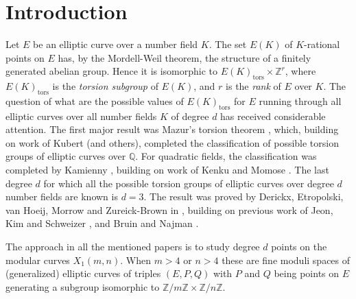 \documentclass[11pt,reqno]{amsart}
\theoremstyle{definition}
\numberwithin{equation}{section}
\newcommand{\Q}{\mathbb{Q}}
\newcommand{\Z}{\mathbb{Z}}
\newcommand{\tor}{\mathrm{tors}}
\def\tg#1#2{\mathbb Z/#1\mathbb Z \times \mathbb Z /#2 \mathbb Z}
\begin{document}
\section{Introduction}
Let $E$ be an elliptic curve over a number field $K$. The set $E(K)$ of $K$-rational points on $E$ has, by the Mordell-Weil theorem, the structure of a finitely generated abelian group. Hence it is isomorphic to $E(K)_\tor \times \Z^r$, where $E(K)_\tor$ is the \textit{torsion subgroup} of $E(K)$, and $r$ is the \textit{rank} of $E$ over $K$. The question of what are the possible values of $E(K)_\tor$ for $E$ running through all elliptic curves over all number fields $K$ of degree $d$ has received considerable attention. The first major result was Mazur's torsion theorem \cite{mazur77}, which, building on work of Kubert \cite{Kubert76} (and others), completed the classification of possible torsion groups of elliptic curves over $\Q.$ For quadratic fields, the classification was completed by Kamienny \cite{kamienny92}, building on work of Kenku and Momose \cite{KM88}. The last degree $d$ for which all the possible torsion groups of elliptic curves over degree $d$ number fields are known is $d=3$. The result was proved by Derickx, Etropolski, van Hoeij, Morrow and Zureick-Brown in \cite{Deg3Class}, building on previous work of Jeon, Kim and Schweizer \cite{JeonKimSchweizer04}, and Bruin and Najman \cite{BruinNajman15}.

The approach in all the mentioned papers is to study degree $d$ points on the modular curves $X_1(m,n)$. When $m > 4$ or $n > 4$ these are fine moduli spaces of (generalized) elliptic curves of triples $(E,P,Q)$ with $P$ and $Q$ being points on $E$ generating a subgroup isomorphic to $\tg{m}{n}$.
\end{document}
